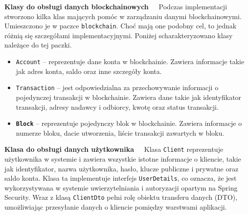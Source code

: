 \noindent \textbf{Klasy do obsługi danych blockchainowych~~}
Podczas implementacji stworzono kilka klas mających pomóc w zarządzaniu danymi blockchainowymi. Umieszczono je w paczce \texttt{blockchain}.
Choć mają one podobny cel, to jednak różnią się szczegółami implementacyjnymi. Poniżej scharakteryzowano klasy należące do tej paczki.
\begin{itemize}
\item \texttt{Account} -- reprezentuje dane konta w blockchainie. Zawiera informacje takie jak adres konta, saldo oraz inne szczegóły konta. 
\item \texttt{Transaction} -- jest odpowiedzialna za przechowywanie informacji o pojedynczej transakcji w blockchainie. Zawiera dane takie jak identyfikator transakcji, adresy nadawcy i odbiorcy, kwotę oraz status transakcji.
\item \textbf{\texttt{Block}} -- reprezentuje pojedynczy blok w blockchainie. Zawiera informacje o numerze bloku, dacie utworzenia, liście transakcji zawartych w bloku. 
\end{itemize}

\noindent \textbf{Klasa do obsługi danych użytkownika~~}
Klasa \texttt{Client} reprezentuje użytkownika w systemie i zawiera wszystkie istotne informacje o kliencie, takie jak identyfikator, nazwa użytkownika, hasło, klucze publiczne i prywatne oraz saldo konta. Klasa ta implementuje interfejs \texttt{UserDetails}, co oznacza, że jest wykorzystywana w systemie uwierzytelniania i autoryzacji opartym na Spring Security. Wraz z klasą \texttt{ClientDto} pełni rolę obiektu transferu danych (DTO), umożliwiając przesyłanie danych o kliencie pomiędzy warstwami aplikacji.\\[-10pt]

